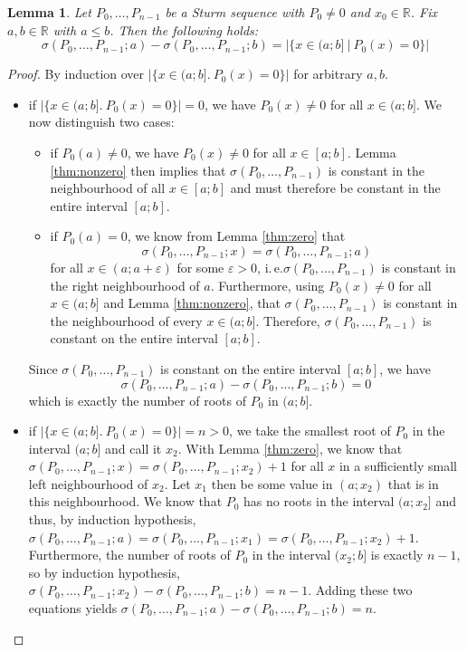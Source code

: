 \documentclass[11pt,a4paper,oneside]{article}
\newtheorem{lemma}[definition]{Lemma}
\newcommand{\RR}{\mathbb{R}}
\renewcommand{\epsilon}{\varepsilon}
\newcommand{\ie}{i.\,e.\xspace}
\begin{document}
\label{thm:count_roots_between}
\begin{lemma}
Let $P_0,\ldots,P_{n-1}$ be a Sturm sequence with $P_0\neq 0$ and $x_0\in\RR$. Fix $a,b\in\RR$ with $a \leq b$. Then the following holds:
$$\sigma(P_0,\ldots,P_{n-1}; a)-\sigma(P_0,\ldots,P_{n-1}; b) = |\{x\in (a;b]\ |\ P_0(x)=0\}|$$
\end{lemma}
\begin{proof}
By induction over $|\{x\in (a;b].\ P_0(x)=0\}|$ for arbitrary $a, b$.
\begin{itemize}
\item if $|\{x\in (a;b].\ P_0(x)=0\}|=0$, we have $P_0(x)\neq 0$ for all $x\in (a;b]$. We now distinguish two cases:
\begin{itemize}
\item if $P_0(a)\neq 0$, we have $P_0(x)\neq 0$ for all $x\in[a;b]$. Lemma \ref{thm:nonzero} then implies that $\sigma(P_0,\ldots,P_{n-1})$ is constant in the neighbourhood of all $x\in[a;b]$ and must therefore be constant in the entire interval $[a;b]$.
\item if $P_0(a)=0$, we know from Lemma \ref{thm:zero} that $$\sigma(P_0,\ldots,P_{n-1}; x)=\sigma(P_0,\ldots,P_{n-1}; a)$$ for all $x\in(a;a+\epsilon)$ for some $\epsilon > 0$, \ie $\sigma(P_0,\ldots,P_{n-1})$ is constant in the right neighbourhood of $a$. Furthermore, using $P_0(x)\neq 0$ for all $x\in(a;b]$ and Lemma \ref{thm:nonzero}, that $\sigma(P_0,\ldots,P_{n-1})$ is constant in the neighbourhood of every $x\in(a;b]$. Therefore, $\sigma(P_0,\ldots,P_{n-1})$ is constant on the entire interval $[a;b]$.
\end{itemize}
Since $\sigma(P_0,\ldots,P_{n-1})$ is constant on the entire interval $[a;b]$, we have $$\sigma(P_0,\ldots,P_{n-1}; a)-\sigma(P_0,\ldots,P_{n-1}; b) = 0$$ which is exactly the number of roots of $P_0$ in $(a;b]$.

\item if $|\{x\in (a;b].\ P_0(x)=0\}|=n>0$, we take the smallest root of $P_0$ in the interval $(a;b]$ and call it $x_2$. With Lemma \ref{thm:zero}, we know that $\sigma(P_0,\ldots,P_{n-1};x) = \sigma(P_0,\ldots,P_{n-1};x_2)+1$ for all $x$ in a sufficiently small left neighbourhood of $x_2$. Let $x_1$ then be some value in $(a;x_2)$ that is in this neighbourhood. We know that $P_0$ has no roots in the interval $(a;x_2]$ and thus, by induction hypothesis, $\sigma(P_0,\ldots,P_{n-1};a)=\sigma(P_0,\ldots,P_{n-1};x_1)=\sigma(P_0,\ldots,P_{n-1};x_2)+1$. Furthermore, the number of roots of $P_0$ in the interval $(x_2;b]$ is exactly $n-1$, so by induction hypothesis, $\sigma(P_0,\ldots,P_{n-1};x_2)-\sigma(P_0,\ldots,P_{n-1};b) = n-1$. Adding these two equations yields $\sigma(P_0,\ldots,P_{n-1};a)-\sigma(P_0,\ldots,P_{n-1};b) = n$.
\end{itemize}
\end{proof}
\end{document}
